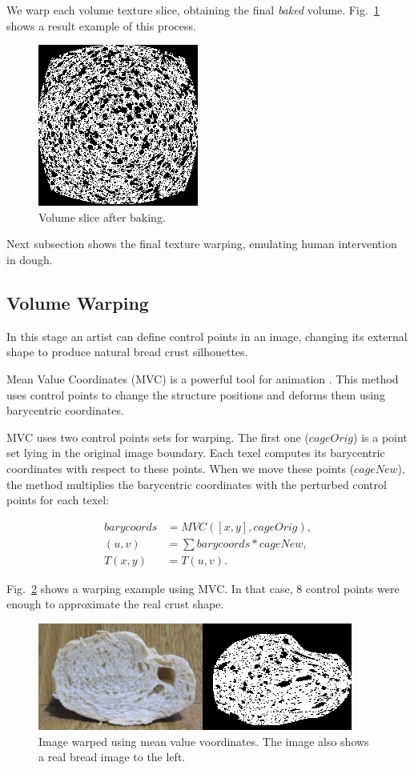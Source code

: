\documentclass[final,5p,times]{elsarticle}
\begin{document}
We warp each volume texture slice, obtaining the final {\em baked} volume. Fig.~\ref{FigBaking} shows a result example of this process.  

\begin{figure}
\includegraphics[scale=1.2]{baking.png}
\caption{Volume slice after baking.}
\label{FigBaking}
\end{figure}

Next subsection shows the final texture warping, emulating human intervention in dough.


\subsection{Volume Warping}
In this stage an artist can define control points in an image, changing its external shape to produce natural bread crust silhouettes. 

Mean Value Coordinates (MVC) is a powerful tool for animation \cite{Floater2003,Floater2005,Ju2005}.  This method uses control points to change the structure positions and deforms them using barycentric coordinates.

MVC uses two control points sets for warping. The first one ($cageOrig$) is a point set lying in the original image boundary.  Each texel computes its barycentric coordinates with respect to these points. When we move these points ($cageNew$), the method multiplies the barycentric coordinates with the perturbed control points for each texel:

\begin{align}
barycoords &= MVC([x,y],cageOrig),\\
(u,v) &= \sum {barycoords * cageNew}, \\
T(x,y) &= T(u,v).
\end{align}

Fig.~\ref{FigMVC} shows a warping example using MVC. In that case, $8$ control points were enough to approximate the real crust shape. 

\begin{figure}[ht!]
\includegraphics[scale=0.65]{warping.png}
\caption{Image warped using mean value voordinates. The image also shows a real bread image to the left. }
\label{FigMVC}
\end{figure}
\end{document}
